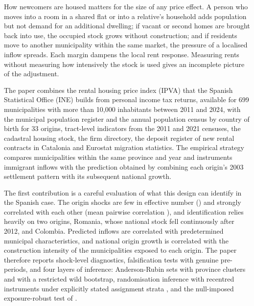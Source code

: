 \documentclass[11pt,a4paper]{article}
\begin{document}
How newcomers are housed matters for the size of any price effect. A person who moves into a room in a shared flat or into a relative's household adds population but not demand for an additional dwelling; if vacant or second homes are brought back into use, the occupied stock grows without construction; and if residents move to another municipality within the same market, the pressure of a localised inflow spreads. Each margin dampens the local rent response. Measuring rents without measuring how intensively the stock is used gives an incomplete picture of the adjustment.

The paper combines the rental housing price index (IPVA) that the Spanish Statistical Office (INE) builds from personal income tax returns, available for 699 municipalities with more than 10,000 inhabitants between 2011 and 2024, with the municipal population register and the annual population census by country of birth for 33 origins, tract-level indicators from the 2011 and 2021 censuses, the cadastral housing stock, the firm directory, the deposit register of new rental contracts in Catalonia and Eurostat migration statistics. The empirical strategy compares municipalities within the same province and year and instruments immigrant inflows with the prediction obtained by combining each origin's 2003 settlement pattern with its subsequent national growth.

The first contribution is a careful evaluation of what this design can identify in the Spanish case. The origin shocks are few in effective number (\effN) and strongly correlated with each other (mean pairwise correlation \corrAll), and identification relies heavily on two origins, Romania, whose national stock fell continuously after 2012, and Colombia. Predicted inflows are correlated with predetermined municipal characteristics, and national origin growth is correlated with the construction intensity of the municipalities exposed to each origin. The paper therefore reports shock-level diagnostics, falsification tests with genuine pre-periods, and four layers of inference: Anderson-Rubin sets with province clusters and with a restricted wild bootstrap, randomisation inference with recentred instruments under explicitly stated assignment strata \citep{borusyak2023}, and the null-imposed exposure-robust test of \citet{adao2019}.
\end{document}
